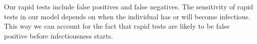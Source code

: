 Our rapid tests include false positives and false negatives. The sensitivity of rapid tests in our model depends on when the individual has
or will become infectious. This way we can account for the fact that rapid tests are
likely to be false positive before infectiousness starts.


